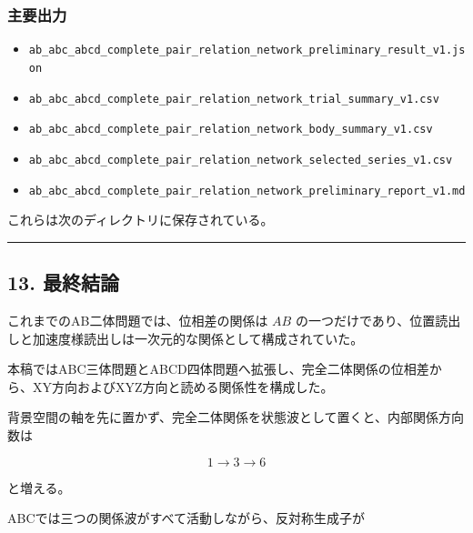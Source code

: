 \documentclass[
  10pt,
  a4paper,
]{article}
\providecommand{\tightlist}{%
  \setlength{\itemsep}{0pt}\setlength{\parskip}{0pt}}
\begin{document}

\subsubsection{主要出力}\label{ux4e3bux8981ux51faux529b}

\begin{itemize}
\tightlist
\item
  \texttt{ab\_abc\_abcd\_complete\_pair\_relation\_network\_preliminary\_result\_v1.json}
\item
  \texttt{ab\_abc\_abcd\_complete\_pair\_relation\_network\_trial\_summary\_v1.csv}
\item
  \texttt{ab\_abc\_abcd\_complete\_pair\_relation\_network\_body\_summary\_v1.csv}
\item
  \texttt{ab\_abc\_abcd\_complete\_pair\_relation\_network\_selected\_series\_v1.csv}
\item
  \texttt{ab\_abc\_abcd\_complete\_pair\_relation\_network\_preliminary\_report\_v1.md}
\end{itemize}

これらは次のディレクトリに保存されている。


\begin{center}\rule{0.5\linewidth}{0.5pt}\end{center}

\subsection{13. 最終結論}\label{ux6700ux7d42ux7d50ux8ad6}

これまでのAB二体問題では、位相差の関係は \(AB\)
の一つだけであり、位置読出しと加速度様読出しは一次元的な関係として構成されていた。

本稿ではABC三体問題とABCD四体問題へ拡張し、完全二体関係の位相差から、XY方向およびXYZ方向と読める関係性を構成した。

背景空間の軸を先に置かず、完全二体関係を状態波として置くと、内部関係方向数は

\[
1\longrightarrow3\longrightarrow6
\]

と増える。

ABCでは三つの関係波がすべて活動しながら、反対称生成子が
\end{document}
